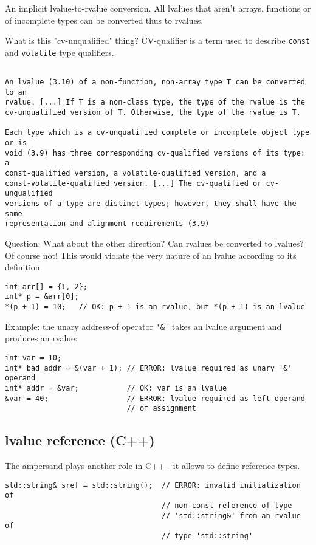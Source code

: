 An implicit lvalue-to-rvalue conversion. All lvalues that aren't arrays,
functions or of incomplete types can be converted thus to rvalues.

What is this "cv-unqualified" thing? CV-qualifier is a term used to describe
\verb!const! and \verb!volatile! type qualifiers.

\begin{verbatim}

An lvalue (3.10) of a non-function, non-array type T can be converted to an
rvalue. [...] If T is a non-class type, the type of the rvalue is the
cv-unqualified version of T. Otherwise, the type of the rvalue is T.

Each type which is a cv-unqualified complete or incomplete object type or is
void (3.9) has three corresponding cv-qualified versions of its type: a
const-qualified version, a volatile-qualified version, and a
const-volatile-qualified version. [...] The cv-qualified or cv-unqualified
versions of a type are distinct types; however, they shall have the same
representation and alignment requirements (3.9)

\end{verbatim}
 
Question:
What about the other direction? Can rvalues be converted to lvalues? Of course
not! This would violate the very nature of an lvalue according to its definition

\begin{verbatim}
int arr[] = {1, 2};
int* p = &arr[0];
*(p + 1) = 10;   // OK: p + 1 is an rvalue, but *(p + 1) is an lvalue

\end{verbatim}

Example:  the unary address-of operator \verb!'&'! takes an lvalue argument and produces an rvalue:
\begin{verbatim}
int var = 10;
int* bad_addr = &(var + 1); // ERROR: lvalue required as unary '&' operand
int* addr = &var;           // OK: var is an lvalue
&var = 40;                  // ERROR: lvalue required as left operand
                            // of assignment
\end{verbatim}

\subsection{lvalue reference (C++)}

The ampersand plays another role in C++ - it allows to define reference types.
\begin{lstlisting}
std::string& sref = std::string();  // ERROR: invalid initialization of
                                    // non-const reference of type
                                    // 'std::string&' from an rvalue of
                                    // type 'std::string'
\end{lstlisting}

